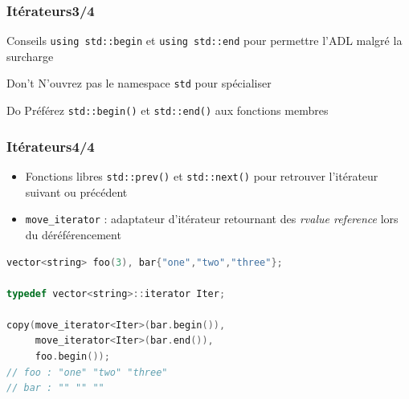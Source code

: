 \documentclass[C++.tex]{subfiles}
\begin{document}
\begin{frame}[fragile]
	\frametitle{Itérateurs\titlehfill{}3/4}
	\begin{block}{Conseils}
		\lstinline|using std::begin| et \lstinline|using std::end| pour permettre l'ADL malgré la surcharge
	\end{block}

	\begin{alertblock}{Don't}
		N'ouvrez pas le namespace \lstinline|std| pour spécialiser
	\end{alertblock}

	\begin{exampleblock}{Do}
		Préférez \lstinline|std::begin()| et \lstinline|std::end()| aux fonctions membres

	\end{exampleblock}
\end{frame}

\begin{frame}[fragile]
	\frametitle{Itérateurs\titlehfill{}4/4}
	\begin{itemize}
		\item Fonctions libres \lstinline|std::prev()| et \lstinline|std::next()| pour retrouver l'itérateur suivant ou précédent
		\item \lstinline|move_iterator| : adaptateur d'itérateur retournant des \textit{rvalue reference} lors du déréférencement
	\end{itemize}

	\begin{lstlisting}[language=C++]
vector<string> foo(3), bar{"one","two","three"};

typedef vector<string>::iterator Iter;

copy(move_iterator<Iter>(bar.begin()),
     move_iterator<Iter>(bar.end()),
     foo.begin());
// foo : "one" "two" "three"
// bar : "" "" ""\end{lstlisting}

\end{frame}
\end{document}
